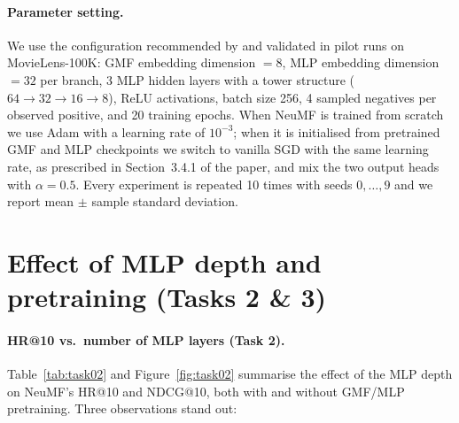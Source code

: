 \documentclass[11pt,a4paper]{article}
\begin{document}
\paragraph{Parameter setting.} We use the configuration recommended by
\cite{he2017ncf} and validated in pilot runs on MovieLens-100K:
GMF embedding dimension $=8$, MLP embedding dimension $=32$ per branch,
3 MLP hidden layers with a tower structure ($64\!\to\!32\!\to\!16\!\to\!8$),
ReLU activations, batch size 256, 4 sampled negatives per observed positive,
and 20 training epochs. When NeuMF is trained from scratch we use Adam
with a learning rate of $10^{-3}$; when it is initialised from pretrained
GMF and MLP checkpoints we switch to vanilla SGD with the same learning
rate, as prescribed in Section~3.4.1 of the paper, and mix the two output
heads with $\alpha = 0.5$. Every experiment is repeated 10 times with seeds
$0,\dots,9$ and we report mean $\pm$ sample standard deviation.

\section{Effect of MLP depth and pretraining (Tasks 2 \& 3)}

\paragraph{HR@10 vs.\ number of MLP layers (Task 2).}
Table~\ref{tab:task02} and Figure~\ref{fig:task02} summarise the effect of
the MLP depth on NeuMF's HR@10 and NDCG@10, both with and without
GMF/MLP pretraining. Three observations stand out:
\end{document}

